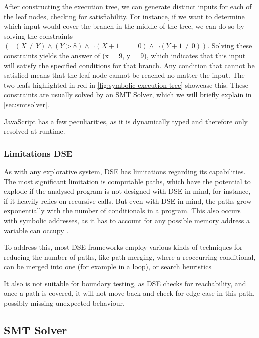 After constructing the execution tree, we can generate distinct inputs for each of the leaf nodes, checking for satisfiability.
For instance, if we want to determine which input would cover the branch in the middle of the tree, we can do so by solving the constraints  $(\neg(X \neq Y) \land (Y > 8) \land \neg( X+1==0 ) \land \neg(Y+1 \neq 0 ))$. 
Solving these constraints yields the answer of (x = 9, y = 9), which indicates that this input will satisfy the specified conditions for that branch. 
Any condition that cannot be satisfied means that the leaf node cannot be reached no matter the input. The two leafs highlighted in red in  \autoref{fig:symbolic-execution-tree} showcase this.
These constraints are usually solved by an SMT Solver, which we will briefly explain in \autoref{sec:smtsolver}.


JavaScript has a few peculiarities, as it is dynamically typed and therefore only resolved at runtime. 

\subsubsection{Limitations DSE}

As with any explorative system, DSE has limitations regarding its capabilities. 
The most significant limitation is computable paths, which have the potential to explode if the analysed program is not designed with DSE in mind, for instance, if it heavily relies on recursive calls. 
But even with DSE in mind, the paths grow exponentially with the number of conditionals in a program.  \cite{cadar_symbolic_2013}
This also occurs with symbolic addresses, as it has to account for any possible memory address a variable can occupy \cite{elkarablieh_precise_2009}.  

To address this, most DSE frameworks employ various kinds of techniques for reducing the number of paths, like path merging, where a reoccurring conditional, can be merged into one (for example in a loop), or search heuristics 

It also is not suitable for boundary testing, as DSE checks for reachability, and once a path is covered, it will not move back and check for edge case in this path, possibly missing unexpected behaviour. \cite{berthier_efficient_2023}


\FloatBarrier
\subsection{SMT Solver}
\label{sec:smtsolver}

